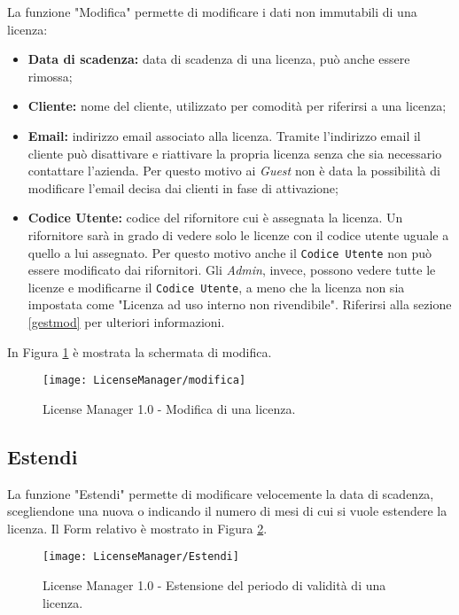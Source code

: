 La funzione "Modifica" permette di modificare i dati non immutabili di una licenza:
\begin{itemize}
\item \textbf{Data di scadenza:} data di scadenza di una licenza, può anche essere rimossa;
\item \textbf{Cliente:} nome del cliente, utilizzato per comodità per riferirsi a una licenza;
\item \textbf{Email:} indirizzo email associato alla licenza. Tramite l’indirizzo email il cliente può disattivare e riattivare la propria licenza senza che sia necessario contattare l’azienda. Per questo motivo ai \textit{Guest} non è data la possibilità di modificare l’email decisa dai clienti in fase di attivazione;
\item \textbf{Codice Utente:} codice del rifornitore cui è assegnata la licenza. Un rifornitore sarà in grado di vedere solo le licenze con il codice utente uguale a quello a lui assegnato. Per questo motivo anche il \texttt{Codice Utente} non può essere modificato dai rifornitori.
Gli \textit{Admin}, invece, possono vedere tutte le licenze e modificarne il \texttt{Codice Utente}, a meno che la licenza non sia impostata come "Licenza ad uso interno non rivendibile". Riferirsi alla sezione \ref{gestmod} per ulteriori informazioni.
\end{itemize} 

In Figura \ref{modifica} è mostrata la schermata di modifica.

\begin{figure}[!h] 
    \centering 
    \texttt{[image: LicenseManager/modifica]} 
    \caption{License Manager 1.0 - Modifica di una licenza.}
\label{modifica}
\end{figure}

\newpage
\subsection{Estendi}
La funzione "Estendi" permette di modificare velocemente la data di scadenza, scegliendone una nuova o indicando il numero di mesi di cui si vuole estendere la licenza.
Il Form relativo è mostrato in Figura \ref{estendi}.

\begin{figure}[!h] 
    \centering 
    \texttt{[image: LicenseManager/Estendi]} 
    \caption{License Manager 1.0 - Estensione del periodo di validità di una licenza.}
\label{estendi}
\end{figure}

